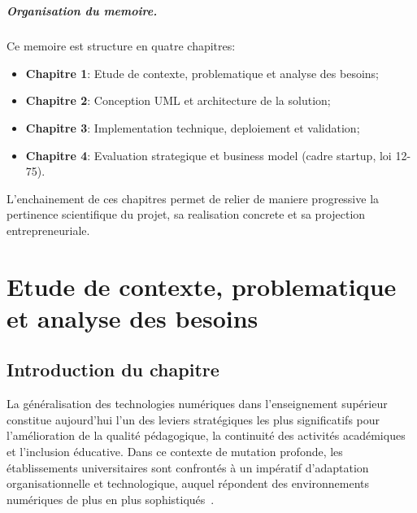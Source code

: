 ﻿﻿\documentclass[12pt,a4paper,oneside]{report}
\begin{document}
\paragraph{Organisation du memoire.}
Ce memoire est structure en quatre chapitres:
\begin{itemize}
  \item \textbf{Chapitre 1}: Etude de contexte, problematique et analyse des besoins;
  \item \textbf{Chapitre 2}: Conception UML et architecture de la solution;
  \item \textbf{Chapitre 3}: Implementation technique, deploiement et validation;
  \item \textbf{Chapitre 4}: Evaluation strategique et business model (cadre startup, loi 12-75).
\end{itemize}

L'enchainement de ces chapitres permet de relier de maniere progressive la pertinence scientifique du projet, sa realisation concrete et sa projection entrepreneuriale.



\chapter{Etude de contexte, problematique et analyse des besoins}

\section{Introduction du chapitre}

La g\'en\'eralisation des technologies num\'eriques dans l'enseignement sup\'erieur constitue aujourd'hui l'un des leviers strat\'egiques les plus significatifs pour l'am\'elioration de la qualit\'e p\'edagogique, la continuit\'e des activit\'es acad\'emiques et l'inclusion \'educative. Dans ce contexte de mutation profonde, les \'etablissements universitaires sont confront\'es \`a un imp\'eratif d'adaptation organisationnelle et technologique, auquel r\'epondent des environnements num\'eriques de plus en plus sophistiqu\'es~\cite{unesco_digital_2026,worldbank_edtech_2026}.
\end{document}
